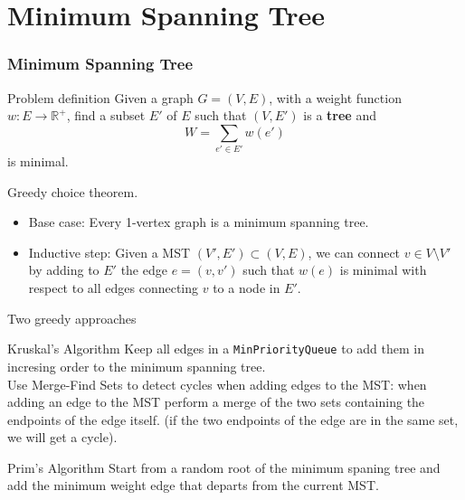 \documentclass{beamer}
\begin{document}
  \section{Minimum Spanning Tree}
  \begin{frame}
  \frametitle{Minimum Spanning Tree}
    \begin{block}{Problem definition}
      Given a graph $G=(V,E)$, with a weight function $w:E\rightarrow \mathbb{R} ^+$, 
      find a subset $E'$ of $E$ such that $(V,E')$ is a \textbf{tree} and
      $$W=\sum_{e'\in E'} w(e')$$ is minimal.
    \end{block}
    \pause
    \alert{Greedy choice theorem.} \begin{itemize}
      \item{Base case:} Every 1-vertex graph is a minimum spanning tree.
      \item{Inductive step:} Given a MST $(V',E')\subset (V,E)$, we can connect $v \in V\setminus V'$ by adding 
        to $E'$ the edge $e=(v,v')$ such that $w(e)$ is minimal with respect to all edges connecting $v$ to a node in $E'$. 
    \end{itemize}
  \end{frame}

  \begin{frame}{Two greedy approaches}
    \begin{block}{Kruskal's Algorithm}
      Keep all edges in a \texttt{MinPriorityQueue} to add them in incresing order to the minimum spanning tree.\\
      Use Merge-Find Sets to detect cycles when adding edges to the MST: when adding an edge to the MST perform a merge of the two sets containing the endpoints of the edge itself.
      (if the two endpoints of the edge are in the same set, we will get a cycle).
    \end{block}
    \begin{block}{Prim's Algorithm}
      Start from a random root of the minimum spaning tree and add the minimum weight edge that departs from the current MST.  
    \end{block}
  \end{frame}
\end{document}

